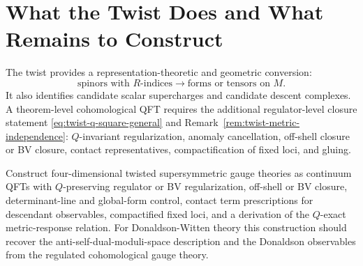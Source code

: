 \section{What the Twist Does and What Remains to Construct}

The twist provides a representation-theoretic and geometric conversion:
\[
  \text{spinors with \(R\)-indices}
  \longrightarrow
  \text{forms or tensors on \(M\)}.
\]
It also identifies candidate scalar supercharges and candidate descent
complexes.  A theorem-level cohomological QFT requires the additional
regulator-level closure statement \eqref{eq:twist-q-square-general} and
Remark~\ref{rem:twist-metric-independence}: \(Q\)-invariant
regularization, anomaly cancellation, off-shell closure or BV closure,
contact representatives, compactification of fixed loci, and gluing.

\begin{openproblem}
\label{op:twisted-continuum-construction}
Construct four-dimensional twisted supersymmetric gauge theories as
continuum QFTs with \(Q\)-preserving regulator or BV regularization,
off-shell or BV closure, determinant-line and global-form control, contact
term prescriptions for descendant observables, compactified fixed loci, and
a derivation of the \(Q\)-exact metric-response relation.  For
Donaldson-Witten theory this construction should recover the
anti-self-dual-moduli-space description and the Donaldson observables from
the regulated cohomological gauge theory.
\end{openproblem}
